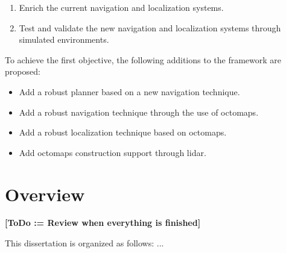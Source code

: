     \begin{enumerate}
      \item Enrich the current navigation and localization systems.
      \item Test and validate the new navigation and localization systems through simulated environments.
    \end{enumerate}

    To achieve the first objective, the following additions to the framework are proposed:

    \begin{itemize}
      \item Add a robust planner based on a new navigation technique.
      \item Add a robust navigation technique through the use of octomaps.
      \item Add a robust localization technique based on octomaps.
      \item Add octomaps construction support through lidar.
    \end{itemize}

  \section{Overview}

    \textbf{[ToDo := Review when everything is finished]}

    This dissertation is organized as follows: ...


